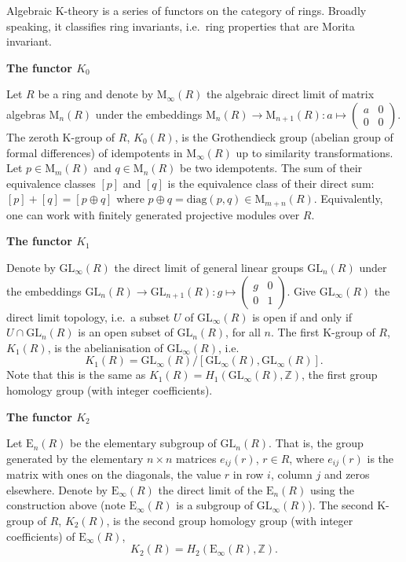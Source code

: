 \documentclass[12pt]{article}
\newcommand*{\Zset}{\mathbb{Z}}
\newcommand*{\GLgrp}{\mathrm{GL}}
\newcommand*{\Egrp}{\mathrm{E}}
\newcommand*{\Matrix}[2]{\mathord{\mathrm{M}_{#1}(#2)}}
\theoremstyle{inlinedefn}
\theoremstyle{break}
\begin{document}
Algebraic K-theory is a series of functors on the category of rings.
Broadly speaking, it classifies ring invariants, i.e.\ ring properties that are Morita invariant.

\textbf{The functor $K_0$}

Let $R$ be a ring and denote by $\Matrix{\infty}{R}$ the algebraic direct limit of matrix algebras $\Matrix{n}{R}$ under the embeddings
$\Matrix{n}{R} \to \Matrix{n+1}{R} : a \mapsto \left(\begin{array}{cc} a & 0 \\ 0 & 0 \end{array}\right)$.
The zeroth K-group of $R$, $K_0(R)$, is the Grothendieck group (abelian group of formal differences) of idempotents in $\Matrix{\infty}{R}$ up to similarity transformations.
Let $p \in \Matrix{m}{R}$ and $q \in \Matrix{n}{R}$ be two idempotents.
The sum of their equivalence classes $[p]$ and $[q]$ is the equivalence class of their direct sum:
$[p]+[q] = [p \oplus q]$ where $p \oplus q = \mathrm{diag}(p,q) \in \Matrix{m+n}{R}$.
Equivalently, one can work with finitely generated projective modules over $R$.

\textbf{The functor $K_1$}

Denote by $\GLgrp_\infty(R)$ the direct limit of general linear groups $\GLgrp_n(R)$ under the embeddings
$\GLgrp_n(R) \to \GLgrp_{n+1}(R) : g \mapsto \left(\begin{array}{cc} g & 0 \\ 0 & 1 \end{array}\right)$.
Give $\GLgrp_\infty(R)$ the direct limit topology, i.e.\
a subset $U$ of $\GLgrp_\infty(R)$ is open if and only if
$U \cap \GLgrp_n(R)$ is an open subset of $\GLgrp_n(R)$, for all $n$.
The first K-group of $R$, $K_1(R)$, is the abelianisation of $\GLgrp_\infty(R)$, i.e.\
\[
K_1(R) = \GLgrp_\infty(R)/[\GLgrp_\infty(R),\GLgrp_\infty(R)].
\]
Note that this is the same as $K_1(R) = H_1(\GLgrp_\infty(R), \Zset)$,
the first group homology group (with integer coefficients).

\textbf{The functor $K_2$}

Let $\Egrp_n(R)$ be the elementary subgroup of $\GLgrp_n(R)$.
That is, the group generated by the elementary $n\times n$ matrices $e_{ij}(r)$, $r\in R$,
where $e_{ij}(r)$ is the matrix with ones on the diagonals, the value $r$ in row $i$, column $j$
and zeros elsewhere.
Denote by $\Egrp_\infty(R)$ the direct limit of the $\Egrp_n(R)$ using the construction above (note $\Egrp_\infty(R)$ is a subgroup of $\GLgrp_\infty(R)$).
The second K-group of $R$, $K_2(R)$, is the second group homology group (with integer coefficients) of $\Egrp_\infty(R)$,
\[
K_2(R) = H_2(\Egrp_\infty(R), \Zset).
\]
\end{document}
